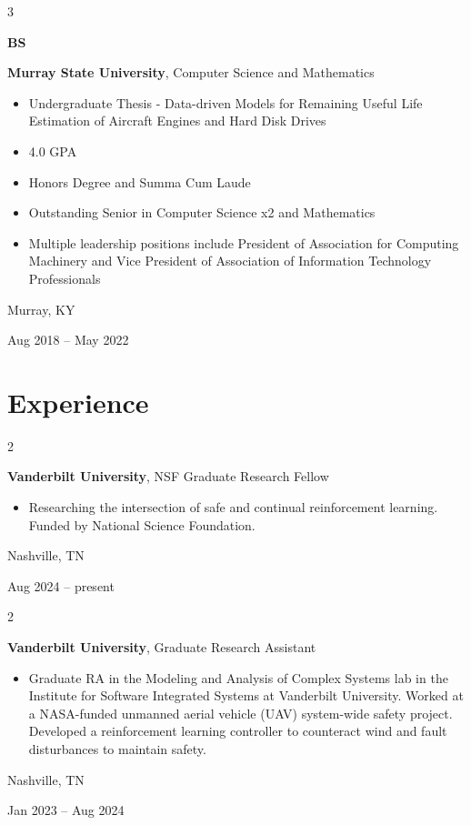 \documentclass[10pt, letterpaper]{article}
\newenvironment{highlights}{
    \begin{itemize}[
        topsep=0.10 cm,
        parsep=0.10 cm,
        partopsep=0pt,
        itemsep=0pt,
        leftmargin=0.4 cm + 10pt
    ]
}{
    \end{itemize}
} %
\newenvironment{twocolentry}[2][]{
    \onecolentry
    \def\secondColumn{#2}
    \setcolumnwidth{\fill, 4.5 cm}
    \begin{paracol}{2}
}{
    \switchcolumn \raggedleft \secondColumn
    \end{paracol}
    \endonecolentry
} %
\newenvironment{threecolentry}[3][]{
    \onecolentry
    \def\thirdColumn{#3}
    \setcolumnwidth{1 cm, \fill, 4.5 cm}
    \begin{paracol}{3}
    {\raggedright #2} \switchcolumn
}{
    \switchcolumn \raggedleft \thirdColumn
    \end{paracol}
    \endonecolentry
} %
\begin{document}
        \vspace{0.2 cm}

        \begin{threecolentry}{\textbf{BS}}{
            Murray, KY

        Aug 2018 – May 2022
        }
            \textbf{Murray State University}, Computer Science and Mathematics
            \begin{highlights}
                \item Undergraduate Thesis - Data-driven Models for Remaining Useful Life Estimation of Aircraft Engines and Hard Disk Drives
                \item 4.0 GPA
                \item Honors Degree and Summa Cum Laude
                \item Outstanding Senior in Computer Science x2 and Mathematics
                \item Multiple leadership positions include President of Association for Computing Machinery and Vice President of Association of Information Technology Professionals
            \end{highlights}
        \end{threecolentry}


    
    \section{Experience}



        
        \begin{twocolentry}{
            Nashville, TN

        Aug 2024 – present
        }
            \textbf{Vanderbilt University}, NSF Graduate Research Fellow
            \begin{highlights}
                \item Researching the intersection of safe and continual reinforcement learning. Funded by National Science Foundation.
            \end{highlights}
        \end{twocolentry}


        \vspace{0.2 cm}

        \begin{twocolentry}{
            Nashville, TN

        Jan 2023 – Aug 2024
        }
            \textbf{Vanderbilt University}, Graduate Research Assistant
            \begin{highlights}
                \item Graduate RA in the Modeling and Analysis of Complex Systems lab in the Institute for Software Integrated Systems at Vanderbilt University. Worked at a NASA-funded unmanned aerial vehicle (UAV) system-wide safety project. Developed a reinforcement learning controller to counteract wind and fault disturbances to maintain safety.
            \end{highlights}
        \end{twocolentry}
\end{document}
